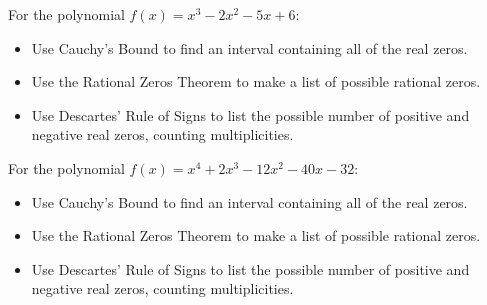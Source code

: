 \documentclass{ximera}
\begin{document}
	\author{Stitz-Zeager}


\begin{problem}\label{prelimpolystufffirst}
For the polynomial $f(x) = x^{3} - 2x^{2} - 5x + 6$:

\begin{itemize}
\item  Use Cauchy's Bound to find an interval containing all of the real zeros.
\item  Use the Rational Zeros Theorem to make a list of possible rational zeros.

\begin{selectAll}
  \end{selectAll}

\item  Use Descartes' Rule of Signs to list the possible number of positive and negative real zeros, counting multiplicities.
\end{itemize}
\end{problem}

\begin{problem}
For the polynomial $f(x) = x^{4} + 2x^{3} - 12x^{2} - 40x - 32$:

\begin{itemize}
\item  Use Cauchy's Bound to find an interval containing all of the real zeros.
\item  Use the Rational Zeros Theorem to make a list of possible rational zeros.
\begin{selectAll}
  \end{selectAll}
  
\item  Use Descartes' Rule of Signs to list the possible number of positive and negative real zeros, counting multiplicities.
\end{itemize}
\end{problem}
\end{document}
